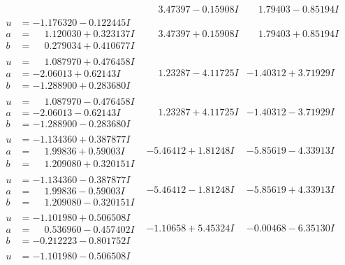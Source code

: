\documentclass[1p]{elsarticle_modified}
\theoremstyle{definition}
\begin{document}
$$\begin{array}{c|c|c}
 & \phantom{-}3.47397 - 0.15908 I & \phantom{-}1.79403 - 0.85194 I \\ \hline\begin{aligned}
u &= -1.176320 - 0.122445 I \\
a &= \phantom{-}1.120030 + 0.323137 I \\
b &= \phantom{-}0.279034 + 0.410677 I\end{aligned}
 & \phantom{-}3.47397 + 0.15908 I & \phantom{-}1.79403 + 0.85194 I \\ \hline\begin{aligned}
u &= \phantom{-}1.087970 + 0.476458 I \\
a &= -2.06013 + 0.62143 I \\
b &= -1.288900 + 0.283680 I\end{aligned}
 & \phantom{-}1.23287 - 4.11725 I & -1.40312 + 3.71929 I \\ \hline\begin{aligned}
u &= \phantom{-}1.087970 - 0.476458 I \\
a &= -2.06013 - 0.62143 I \\
b &= -1.288900 - 0.283680 I\end{aligned}
 & \phantom{-}1.23287 + 4.11725 I & -1.40312 - 3.71929 I \\ \hline\begin{aligned}
u &= -1.134360 + 0.387877 I \\
a &= \phantom{-}1.99836 + 0.59003 I \\
b &= \phantom{-}1.209080 + 0.320151 I\end{aligned}
 & -5.46412 + 1.81248 I & -5.85619 - 4.33913 I \\ \hline\begin{aligned}
u &= -1.134360 - 0.387877 I \\
a &= \phantom{-}1.99836 - 0.59003 I \\
b &= \phantom{-}1.209080 - 0.320151 I\end{aligned}
 & -5.46412 - 1.81248 I & -5.85619 + 4.33913 I \\ \hline\begin{aligned}
u &= -1.101980 + 0.506508 I \\
a &= \phantom{-}0.536960 - 0.457402 I \\
b &= -0.212223 - 0.801752 I\end{aligned}
 & -1.10658 + 5.45324 I & -0.00468 - 6.35130 I \\ \hline\begin{aligned}
u &= -1.101980 - 0.506508 I \\

\end{aligned}
\end{array}$$
\end{document}
